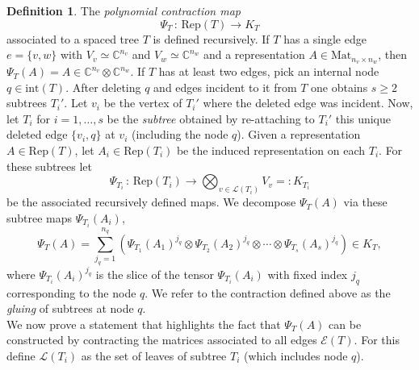 \documentclass[12pt]{article}
\theoremstyle{definition}
\newtheorem{definition}[theorem]{Definition}
\numberwithin{theorem}{section}
\newcommand{\CC}{\mathbb{C}}
\begin{document}
\begin{definition}\cite{DK09} \label{defn:spaced-tree-contraction}
The \emph{polynomial contraction map}
\begin{equation*}
    \Psi_T \, : \, \mathrm{Rep}(T) \longrightarrow K_T
\end{equation*}
associated to a spaced tree $T$ is defined recursively. If $T$ has a single edge $e=\{v,w\}$ with $V_v \simeq \CC^{n_v}$
and $V_w \simeq \CC^{n_w}$ and a representation $A \in \mathrm{Mat}_{n_v \times n_w}$, then $\Psi_T(A) = A \in \CC^{n_v} \otimes \CC^{n_w}$. 
If $T$ has at least two edges, pick an internal node $q \in \mathrm{int}(T)$. After deleting $q$ and edges incident to it from $T$ one obtains $s\geq 2$ subtrees $T_i'$. Let $v_i$ be the vertex of $T_i'$ where the deleted edge was incident. Now, let $T_i$ for $i=1, \ldots, s$ be the \emph{subtree} obtained by re-attaching to $T_i'$ this unique deleted edge $\{v_i,q\}$ at $v_i$ (including the node $q$).
 Given a representation $A \in \mathrm{Rep}(T)$, let $A_i \in \mathrm{Rep}(T_i)$ be the induced representation on each $T_i$. For these subtrees let
\begin{equation}
\label{eq:subtree-rep-map}
\Psi_{T_i} \, : \, \mathrm{Rep}(T_i) \longrightarrow \bigotimes_{v \in \mathcal{L}(T_i)} V_v =: K_{T_i}
\end{equation}
 be the associated recursively defined maps. We decompose $\Psi_T(A)$ via these subtree maps $\Psi_{T_i}(A_i)$,
\begin{equation}\label{eq:psi_map_explicit}
    \Psi_T(A) = \sum_{j_q=1}^{n_q} \left( \Psi_{T_1}(A_1)^{j_q} \otimes \Psi_{T_2}(A_2)^{j_q} \otimes \cdots \otimes \Psi_{T_s}(A_s)^{j_q}\right) \in K_T, 
\end{equation}
where $\Psi_{T_i}(A_i)^{j_q}$ is the slice of the tensor $\Psi_{T_i}(A_i)$ with fixed index $j_q$ corresponding to the node $q$. We refer to the contraction defined above as the \emph{gluing} of subtrees at node $q$. 
\\
We now prove a statement that highlights the fact that $\Psi_T(A)$ can be constructed by contracting  the matrices associated to all edges $\mathcal{E}(T)$.  For this define $\mathcal{L}(T_i)$ as the set of leaves of subtree $T_i$ (which includes node $q$).
\end{definition}
\end{document}
